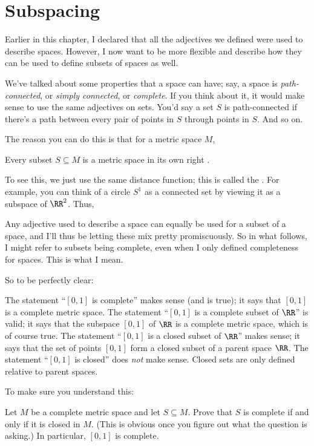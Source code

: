 \section{Subspacing}
Earlier in this chapter,
I declared that all the adjectives we defined were used to describe spaces.
However, I now want to be more flexible and describe
how they can be used to define subsets of spaces as well.

We've talked about some properties that a space can have;
say, a space is \emph{path-connected}, or \emph{simply connected}, or \emph{complete}.
If you think about it, it would make sense to use the same adjectives on sets.
You'd say a set $S$ is path-connected if there's a path between
every pair of points in $S$ through points in $S$. And so on.

The reason you can do this is that for a metric space $M$,
\begin{moral}
	Every subset $S \subseteq M$ is a metric space in its own right .
\end{moral}
To see this, we just use the same distance function;
this is called the .
For example, you can think of a circle $S^1$ as a connected set
by viewing it as a subspace of $\RR^2$.
Thus,
\begin{abuse}
	Any adjective used to describe a space can equally be used for a subset of a space,
	and I'll thus be letting these mix pretty promiscuously.
	So in what follows, I might refer to subsets being complete,
	even when I only defined completeness for spaces.
	This is what I mean.
\end{abuse}
So to be perfectly clear:
\begin{itemize}
	\ii The statement ``$[0,1]$ is complete'' makes sense (and is true);
	it says that $[0,1]$ is a complete metric space.
	\ii The statement ``$[0,1]$ is a complete subset of $\RR$'' is valid;
	it says that the subspace $[0,1]$ of $\RR$ is a complete metric space,
	which is of course true.
	\ii The statement ``$[0,1]$ is a closed subset of $\RR$'' makes sense;
	it says that the set of points $[0,1]$ form a closed subset of a parent space $\RR$.
	\ii The statement ``$[0,1]$ is closed'' does \emph{not} make sense.
	Closed sets are only defined relative to parent spaces.
\end{itemize}

To make sure you understand this:
\begin{ques}
	Let $M$ be a complete metric space and let $S \subseteq M$.
	Prove that $S$ is complete if and only if it is closed in $M$.
	(This is obvious once you figure out what the question is asking.)
	In particular, $[0,1]$ is complete.
\end{ques}

